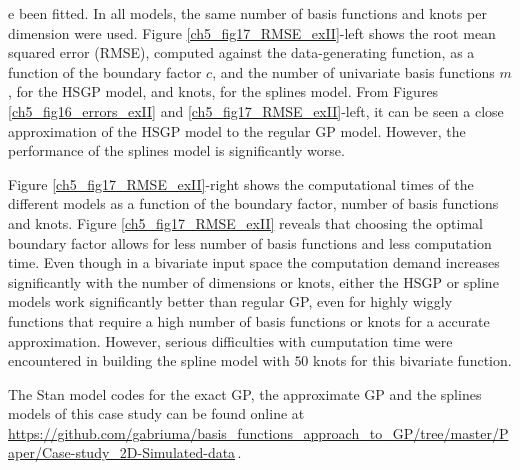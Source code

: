 \documentclass[onecolumn,a4paper,11pt]{article}
\begin{document}
e been fitted. In all models, the same number of basis functions and knots per dimension were used. Figure \ref{ch5_fig17_RMSE_exII}-left shows the root mean squared error (RMSE), computed against the data-generating function, as a function of the boundary factor $c$, and the number of univariate basis functions $m$, for the HSGP model, and knots, for the splines model. From Figures \ref{ch5_fig16_errors_exII} and \ref{ch5_fig17_RMSE_exII}-left, it can be seen a close approximation of the HSGP model to the regular GP model. However, the performance of the splines model is significantly worse. 

Figure \ref{ch5_fig17_RMSE_exII}-right shows the computational times of the different models as a function of the boundary factor, number of basis functions and knots. Figure \ref{ch5_fig17_RMSE_exII} reveals that choosing the optimal boundary factor allows for less number of basis functions and less computation time. Even though in a bivariate input space the computation demand increases significantly with the number of dimensions or knots, either the HSGP or spline models work significantly better than regular GP, even for highly wiggly functions that require a high number of basis functions or knots for a accurate approximation. However, serious difficulties with cumputation time were encountered in building the spline model with $50$ knots for this bivariate function.

The Stan model codes for the exact GP, the approximate GP and the splines models of this case study can be found online at {\small \url{https://github.com/gabriuma/basis_functions_approach_to_GP/tree/master/Paper/Case-study_2D-Simulated-data}}\,.
\end{document}
